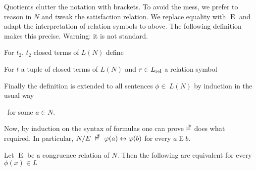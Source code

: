 \documentclass[creche.tex]{subfiles}
\begin{document}
\noindent\llap{\textcolor{red}{\Large\danger}\kern1.5ex}Quotients clutter the notation with brackets. To avoid the mess, we prefer to reason in $N$ and tweak the satisfaction relation.  We replace equality with $\mathrel{E}$ and adapt the interpretation of relation symbols to  above. The following definition makes this precise. Warning: it is not standard. 

\begin{definition}\label{def_pseudostructure}
For $t_2$, $t_2$ closed terms of $L(N)$ define


For $t$ a tuple of closed terms of $L(N)$ and $r\in L_{\rm rel}$ a relation symbol


Finally the definition is extended to all sentences $\phi\in\ L(N)$ by induction in the usual way



\ for some $a\in N$.\QED
\end{definition}

% 
% 
% 

Now, by induction on the syntax of formulas one can prove $\pmodels$ does what required. In particular, $N/E\ \pmodels\ \phi(a)\iff\phi(b)$ for every $a\mathrel{E} b$.

\begin{proposition}\label{prop_pseudomodel}
Let $\mathrel{E}$ be a congruence relation of $N$. Then the following are equivalent for every $\phi(x)\in L$


\QED
\end{proposition}
\end{document}
